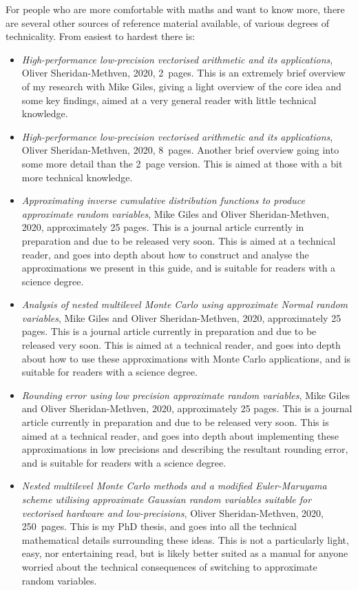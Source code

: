 \documentclass[11pt,a4paper,twoside,english]{extarticle}
\begin{document}
For people who are more comfortable with maths and want to know more, there are several other sources of reference material available, of various degrees of technicality. From easiest to hardest there is:
\begin{itemize}
\item \emph{High-performance low-precision vectorised arithmetic and its applications}, Oliver Sheridan-Methven, 2020, 2~pages. This is an extremely brief overview of my research with Mike Giles, giving a light overview of the core idea and some key findings, aimed at a very general reader with little technical knowledge. 

\item \emph{High-performance low-precision vectorised arithmetic and its applications}, Oliver Sheridan-Methven, 2020, 8~pages. Another brief overview going into some more detail than the 2~page version. This is aimed at those with a bit more technical knowledge. 

\item \emph{Approximating inverse cumulative distribution functions to produce approximate random variables}, Mike Giles and Oliver Sheridan-Methven, 2020,  approximately 25 pages. This is a journal article currently in preparation and due to be released very soon. This is aimed at a technical reader, and goes into depth about how to construct and analyse the approximations we present in this guide, and is suitable for readers with a science degree.

\item \emph{Analysis of nested multilevel Monte Carlo using approximate Normal random variables}, Mike Giles and Oliver Sheridan-Methven, 2020,  approximately 25 pages. This is a journal article currently in preparation and due to be released very soon. This is aimed at a technical reader, and goes into depth about how to use these approximations with Monte Carlo applications, and is suitable for readers with a science degree.

\item \emph{Rounding error using low precision approximate random variables}, Mike Giles and Oliver Sheridan-Methven, 2020,  approximately 25 pages. This is a journal article currently in preparation and due to be released very soon. This is aimed at a technical reader, and goes into depth about implementing these approximations in low precisions and describing the resultant rounding error, and is suitable for readers with a science degree.

\item \emph{Nested multilevel Monte Carlo methods and a modified Euler-Maruyama scheme utilising approximate Gaussian random variables suitable for vectorised hardware and low-precisions}, Oliver Sheridan-Methven, 2020, 250~pages. This is my PhD thesis, and goes into all the technical mathematical details surrounding these ideas. This is not a particularly light, easy, nor entertaining read, but is likely better suited as a manual for anyone worried about the technical consequences of switching to approximate random variables. 
\end{itemize}
\end{document}
